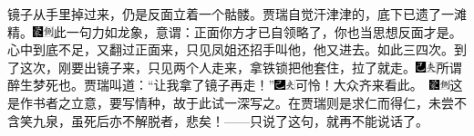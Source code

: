 镜子从手里掉过来，仍是反面立着一个骷髅。贾瑞自觉汗津津的，底下已遗了一滩精。{\includegraphics[width=3mm]{../Images/00006}\includegraphics[width=3mm]{../Images/00011}\footnotesize \kaishu 此一句力如龙象，意谓：正面你方才已自领略了，你也当思想反面才是。}心中到底不足，又翻过正面来，只见凤姐还招手叫他，他又进去。如此三四次。到了这次，刚要出镜子来，只见两个人走来，拿铁锁把他套住，拉了就走。{\includegraphics[width=3mm]{../Images/00003}\includegraphics[width=3mm]{../Images/00012}\footnotesize \kaishu 所谓醉生梦死也。}贾瑞叫道：“让我拿了镜子再走！”{\includegraphics[width=3mm]{../Images/00003}\includegraphics[width=3mm]{../Images/00012}\footnotesize \kaishu 可怜！大众齐来看此。　\includegraphics[width=3mm]{../Images/00006}\includegraphics[width=3mm]{../Images/00011}\footnotesize \kaishu 这是作书者之立意，要写情种，故于此试一深写之。在贾瑞则是求仁而得仁，未尝不含笑九泉，虽死后亦不解脱者，悲矣！}------只说了这句，就再不能说话了。

